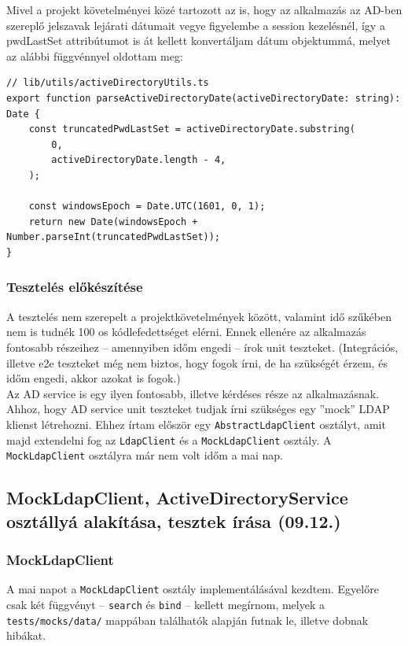 \documentclass[a4paper]{article}
\newcommand{\inlts}[1]{\texttt{#1}}
\begin{document}
Mivel a projekt követelményei közé tartozott az is, hogy az alkalmazás az AD-ben szereplő jelszavak
lejárati dátumait vegye figyelembe a session kezelésnél, így a pwdLastSet attribútumot is át kellett
konvertáljam dátum objektummá, melyet az alábbi függvénnyel oldottam meg:

\FloatBarrier
\begin{verbatim}
// lib/utils/activeDirectoryUtils.ts
export function parseActiveDirectoryDate(activeDirectoryDate: string): Date {
	const truncatedPwdLastSet = activeDirectoryDate.substring(
		0,
		activeDirectoryDate.length - 4,
	);

	const windowsEpoch = Date.UTC(1601, 0, 1);
	return new Date(windowsEpoch + Number.parseInt(truncatedPwdLastSet));
}
\end{verbatim}

\subsubsection*{Tesztelés előkészítése}
A tesztelés nem szerepelt a projektkövetelmények között, valamint idő szűkében nem is tudnék 100%
os kódlefedettséget elérni. Ennek ellenére az alkalmazás fontosabb részeihez – amennyiben időm
engedi – írok unit teszteket. (Integrációs, illetve e2e teszteket még nem biztos, hogy fogok írni, de ha
szükségét érzem, és időm engedi, akkor azokat is fogok.) \\

Az AD service is egy ilyen fontosabb, illetve kérdéses része az alkalmazásnak. Ahhoz, hogy AD service
unit teszteket tudjak írni szükséges egy ”mock” LDAP klienst létrehozni. Ehhez írtam először egy
\inlts{AbstractLdapClient} osztályt, amit majd extendelni fog az \inlts{LdapClient} és a \inlts{MockLdapClient}
osztály. A \inlts{MockLdapClient} osztályra már nem volt időm a mai nap.

\subsection{MockLdapClient, ActiveDirectoryService osztállyá alakítása, tesztek
írása (09.12.)}

\subsubsection*{MockLdapClient}

A mai napot a \inlts{MockLdapClient} osztály implementálásával kezdtem. Egyelőre csak két függvényt –
\inlts{search} és \inlts{bind} – kellett megírnom, melyek a \inlts{tests/mocks/data/} mappában találhatók alapján
futnak le, illetve dobnak hibákat.
\end{document}

